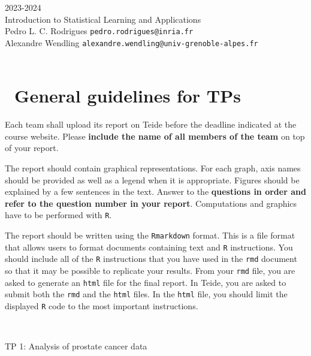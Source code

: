 \begin{flushleft}
 \hfill {} 2023-2024 \\
Introduction to Statistical Learning and Applications \\
Pedro L. C. Rodrigues   \hfill  \texttt{pedro.rodrigues@inria.fr} \\
Alexandre Wendling \hfill \texttt{alexandre.wendling@univ-grenoble-alpes.fr} \\

\HRuleTop\\

\section*{\faExclamationTriangle~General guidelines for TPs}

Each team shall upload its report on Teide before the deadline indicated at the course website. Please \textbf{include the name of all members of the team} on top of your report. 

The report should contain graphical representations. For each graph, axis names should be provided as well as a legend when it is appropriate. Figures should be explained by a few sentences in the text. Answer to the \textbf{questions in order and refer to the question number in your report}. Computations and graphics have to be performed with \texttt{R}.

The report should be written using the \texttt{Rmarkdown} format. This is a file format that allows users to format documents containing text and \texttt{R} instructions. You should include all of the \texttt{R} instructions that you have used in the \texttt{rmd} document so that it may be possible to replicate your results. From your \texttt{rmd} file, you are asked to generate an \texttt{html} file for the final report. In Teide, you are asked to submit both the \texttt{rmd} and the \texttt{html} files. In the \texttt{html} file, you should limit the displayed \texttt{R} code to the most important instructions.

\HRuleTop\\
\begin{center}
\Large{TP 1: Analysis of prostate cancer data}
\end{center}
\HRuleBottom
\end{flushleft}
